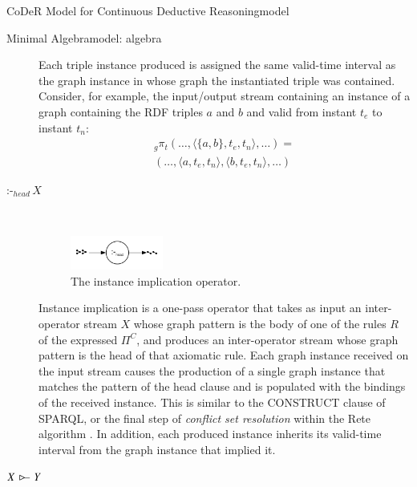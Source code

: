 \begin{nestedsection}{CoDeR Model for Continuous Deductive Reasoning}{model}
\begin{nestedsection}{Minimal Algebra}{model: algebra}
\begin{description}
				Each triple instance produced is assigned the same valid-time interval as the graph instance in whose graph the instantiated triple was contained.
				Consider, for example, the input/output stream containing an instance of a graph containing the RDF triples $a$ and $b$ and valid from instant $t_e$ to instant $t_n$:
				\begin{multline*}
					{}_g{\pi_t} (\dots,\langle \{a,b\},t_e,t_n \rangle,\dots) = \\
						(\dots,\langle a,t_e,t_n \rangle,\langle b,t_e,t_n \rangle,\dots)
				\end{multline*}
			\item[$\text{:-}_{head}\,X$] \hfill \\
				\begin{figure}[b]
					\centering
					\includegraphics[width=0.3\textwidth]{instance-implication}
					\caption{The instance implication operator.}
				\end{figure}
				Instance implication is a one-pass operator that takes as input an inter-operator stream $X$ whose graph pattern is the body of one of the rules $R$ of the expressed $\Pi^C$, and produces an inter-operator stream whose graph pattern is the head of that axiomatic rule.
				Each graph instance received on the input stream causes the production of a single graph instance that matches the pattern of the head clause and is populated with the bindings of the received instance.
				This is similar to the CONSTRUCT clause of SPARQL, or the final step of \emph{conflict set resolution} within the Rete algorithm \citep{forgy79}.
				In addition, each produced instance inherits its valid-time interval from the graph instance that implied it.
			\item[${X\,\rstreamjoin\,Y}$] \hfill \\
				\begin{figure}[t]
					\centering
					\\

\end{figure}
\end{description}
\end{nestedsection}
\end{nestedsection}

